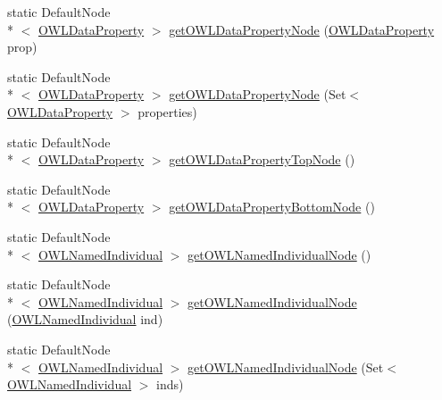 \begin{DoxyCompactItemize}
\item 
static Default\-Node\\*
$<$ \hyperlink{interfaceorg_1_1semanticweb_1_1owlapi_1_1model_1_1_o_w_l_data_property}{O\-W\-L\-Data\-Property} $>$ \hyperlink{classorg_1_1semanticweb_1_1owlapi_1_1reasoner_1_1impl_1_1_node_factory_a548517fd0cebc5e9b06e27b81000c19f}{get\-O\-W\-L\-Data\-Property\-Node} (\hyperlink{interfaceorg_1_1semanticweb_1_1owlapi_1_1model_1_1_o_w_l_data_property}{O\-W\-L\-Data\-Property} prop)
\item 
static Default\-Node\\*
$<$ \hyperlink{interfaceorg_1_1semanticweb_1_1owlapi_1_1model_1_1_o_w_l_data_property}{O\-W\-L\-Data\-Property} $>$ \hyperlink{classorg_1_1semanticweb_1_1owlapi_1_1reasoner_1_1impl_1_1_node_factory_a3b866737ddb844c4f85d537134d79359}{get\-O\-W\-L\-Data\-Property\-Node} (Set$<$ \hyperlink{interfaceorg_1_1semanticweb_1_1owlapi_1_1model_1_1_o_w_l_data_property}{O\-W\-L\-Data\-Property} $>$ properties)
\item 
static Default\-Node\\*
$<$ \hyperlink{interfaceorg_1_1semanticweb_1_1owlapi_1_1model_1_1_o_w_l_data_property}{O\-W\-L\-Data\-Property} $>$ \hyperlink{classorg_1_1semanticweb_1_1owlapi_1_1reasoner_1_1impl_1_1_node_factory_ac1a93467cfc7c3a961068a7959300758}{get\-O\-W\-L\-Data\-Property\-Top\-Node} ()
\item 
static Default\-Node\\*
$<$ \hyperlink{interfaceorg_1_1semanticweb_1_1owlapi_1_1model_1_1_o_w_l_data_property}{O\-W\-L\-Data\-Property} $>$ \hyperlink{classorg_1_1semanticweb_1_1owlapi_1_1reasoner_1_1impl_1_1_node_factory_aad5ba35376228d93872a04cffc97b2ed}{get\-O\-W\-L\-Data\-Property\-Bottom\-Node} ()
\item 
static Default\-Node\\*
$<$ \hyperlink{interfaceorg_1_1semanticweb_1_1owlapi_1_1model_1_1_o_w_l_named_individual}{O\-W\-L\-Named\-Individual} $>$ \hyperlink{classorg_1_1semanticweb_1_1owlapi_1_1reasoner_1_1impl_1_1_node_factory_a2c465eb1544cd5de4fca09e0e8295109}{get\-O\-W\-L\-Named\-Individual\-Node} ()
\item 
static Default\-Node\\*
$<$ \hyperlink{interfaceorg_1_1semanticweb_1_1owlapi_1_1model_1_1_o_w_l_named_individual}{O\-W\-L\-Named\-Individual} $>$ \hyperlink{classorg_1_1semanticweb_1_1owlapi_1_1reasoner_1_1impl_1_1_node_factory_a5955228a3f71347b5e061a858333d2bc}{get\-O\-W\-L\-Named\-Individual\-Node} (\hyperlink{interfaceorg_1_1semanticweb_1_1owlapi_1_1model_1_1_o_w_l_named_individual}{O\-W\-L\-Named\-Individual} ind)
\item 
static Default\-Node\\*
$<$ \hyperlink{interfaceorg_1_1semanticweb_1_1owlapi_1_1model_1_1_o_w_l_named_individual}{O\-W\-L\-Named\-Individual} $>$ \hyperlink{classorg_1_1semanticweb_1_1owlapi_1_1reasoner_1_1impl_1_1_node_factory_a8ccf895daf14f35eb3c21b5fa4ef8703}{get\-O\-W\-L\-Named\-Individual\-Node} (Set$<$ \hyperlink{interfaceorg_1_1semanticweb_1_1owlapi_1_1model_1_1_o_w_l_named_individual}{O\-W\-L\-Named\-Individual} $>$ inds)
\end{DoxyCompactItemize}



